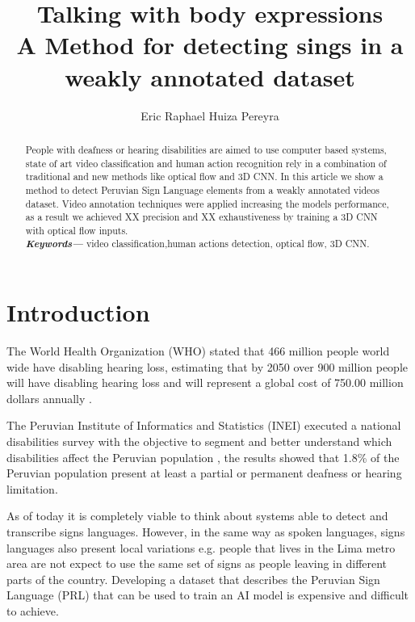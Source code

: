 \documentclass[twocolumn]{article}
\providecommand{\keywords}[1]
{
  \small	
  \textbf{\textit{Keywords---}} #1
}
\begin{document}
\author[1]{Eric Raphael Huiza Pereyra}

\title{%
	\vspace{-2.0cm}
	\textbf{Talking with body expressions} \\	
	\Large \textbf{A Method for detecting sings in a weakly annotated dataset}
}

\maketitle
    
\begin{abstract}
People with deafness or hearing disabilities are aimed to use computer based systems, state of art video classification and human action recognition rely in a combination of traditional and new methods like optical flow and 3D CNN. In this article we show a method to detect Peruvian Sign Language elements from a weakly annotated videos dataset. Video annotation techniques were applied increasing the models performance, as a result we achieved XX precision and XX exhaustiveness by training a 3D CNN with optical flow inputs.   \\
\keywords{video classification,human actions detection, optical flow, 3D CNN.}
\end{abstract}

\section{Introduction}\label{intro}

The World Health Organization (WHO) stated that 466 million people world wide have disabling hearing loss, estimating that by 2050 over 900 million people will have disabling hearing loss and will represent a global cost of 750.00 million dollars annually \cite{deafness_and_hearing_loss_2019}. 

The Peruvian Institute of Informatics and Statistics (INEI) executed a national disabilities survey with the objective to segment and better understand which disabilities affect the Peruvian population \cite{disabilities_survey_2012}, the results showed that 1.8\% of the Peruvian population present at least a partial or permanent deafness or hearing limitation. 

As of today it is completely viable to think about systems able to detect and transcribe signs languages. However, in the same way as spoken languages, signs languages also present local variations e.g. people that lives in the Lima metro area are not expect to use the same set of signs as people leaving in different parts of the country. Developing a dataset that describes the Peruvian Sign Language (PRL) \cite{lsp_2015} that can be used to train an AI model is expensive and difficult to achieve. 
\end{document}
